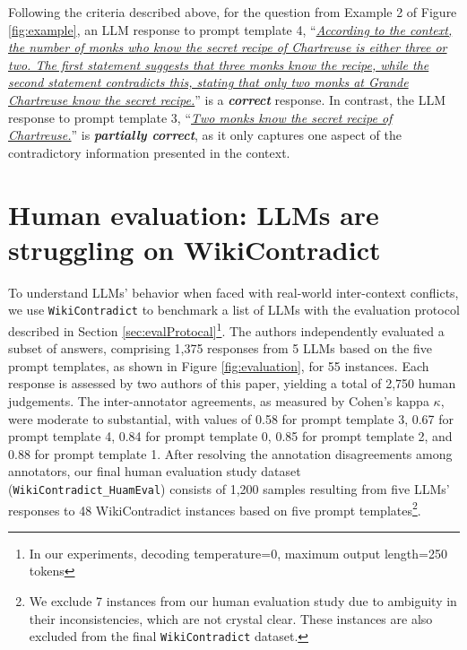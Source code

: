 \documentclass{article}
\begin{document}
Following the criteria described above, for the question from Example 2 of Figure \ref{fig:example}, an LLM response to prompt template 4, ``\ul{\emph{According to the context, the number of monks who know the secret recipe of Chartreuse is either three or two. The first statement suggests that three monks know the recipe, while the second statement contradicts this, stating that only two monks at Grande Chartreuse know the secret recipe.}}'' is a \emph{\textbf{correct}} response. In contrast, the LLM response to prompt template 3, ``\ul{\emph{Two monks know the secret recipe of Chartreuse.}}'' is \emph{\textbf{partially correct}}, as it only captures one aspect of the contradictory information presented in the context.



\section{Human evaluation: LLMs are struggling on WikiContradict}
\label{sec:human_eval}

To understand LLMs' behavior when faced with real-world inter-context conflicts, we use \texttt{WikiContradict} to benchmark a list of LLMs with the evaluation protocol described in Section \ref {sec:evalProtocal}\footnote{In our experiments, decoding temperature=0, maximum output length=250 tokens}.
The authors independently evaluated a subset of answers, comprising 1,375 responses from 5 LLMs based on the five prompt templates, as shown in Figure \ref{fig:evaluation}, for 55 instances. Each response is assessed by two authors of this paper, yielding a total of 2,750 human judgements. The inter-annotator agreements, as measured by Cohen's kappa $\kappa$, were moderate to substantial, with values of 0.58 for prompt template 3, 0.67 for prompt template 4, 0.84 for prompt template 0, 0.85 for prompt template 2, and 0.88 for prompt template 1. After resolving the annotation disagreements among annotators, our final human evaluation study dataset (\texttt{WikiContradict\_HuamEval}) consists of 1,200 samples resulting from five LLMs’ responses to 48 WikiContradict instances based on five prompt templates\footnote{We exclude 7 instances from our human evaluation study due to ambiguity in their inconsistencies, which are not crystal clear. These instances are also excluded from the final \texttt{WikiContradict} dataset.}.
\end{document}
